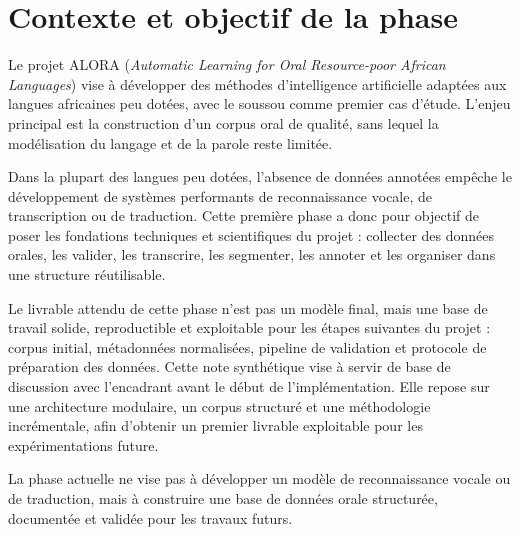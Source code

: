 \section{Contexte et objectif de la phase}

Le projet ALORA (\textit{Automatic Learning for Oral Resource-poor African
Languages}) vise à développer des méthodes d'intelligence artificielle
adaptées aux langues africaines peu dotées, avec le soussou comme
premier cas d'étude. L'enjeu principal est la construction d'un corpus
oral de qualité, sans lequel la modélisation du langage et de la parole
reste limitée.

Dans la plupart des langues peu dotées, l'absence de données annotées
empêche le développement de systèmes performants de reconnaissance
vocale, de transcription ou de traduction. Cette première phase a donc
pour objectif de poser les fondations techniques et scientifiques du
projet : collecter des données orales, les valider, les transcrire,
les segmenter, les annoter et les organiser dans une structure
réutilisable.

Le livrable attendu de cette phase n'est pas un modèle final, mais une
base de travail solide, reproductible et exploitable pour les étapes
suivantes du projet : corpus initial, métadonnées normalisées, pipeline
de validation et protocole de préparation des données. Cette note
synthétique vise à servir de base de discussion avec l'encadrant avant
le début de l'implémentation. Elle repose sur une architecture
modulaire, un corpus structuré et une méthodologie incrémentale, afin
d'obtenir un premier livrable exploitable pour les expérimentations
future.

\begin{important}
La phase actuelle ne vise pas à développer un modèle de reconnaissance
vocale ou de traduction, mais à construire une base de données orale
structurée, documentée et validée pour les travaux futurs.
\end{important}